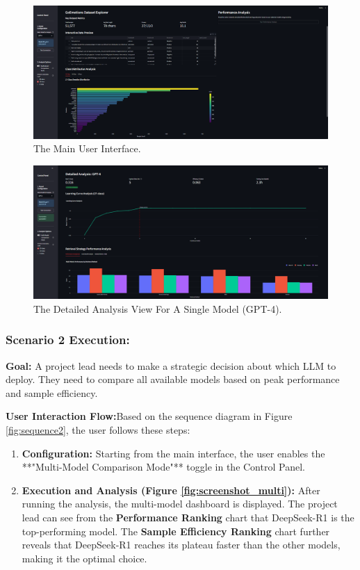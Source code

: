\begin{figure}[H]
    \centering
    \includegraphics[width=\textwidth]{Images/screenshot_main.PNG}
    \caption{The Main User Interface.}
    \label{fig:screenshot_main}
\end{figure}

\begin{figure}[H]
    \centering
    \includegraphics[width=\textwidth]{Images/screenshot_single_model.PNG}
    \caption{The Detailed Analysis View For A Single Model (GPT-4).}
    \label{fig:screenshot_single}
\end{figure}

\subsubsection{Scenario 2 Execution:}

\textbf{Goal:} A project lead needs to make a strategic decision about which LLM to deploy. They need to compare all available models based on peak performance and sample efficiency.

\textbf{User Interaction Flow:}Based on the sequence diagram in Figure \ref{fig:sequence2}, the user follows these steps:
\begin{enumerate}
    \item \textbf{Configuration:} Starting from the main interface, the user enables the **"Multi-Model Comparison Mode"** toggle in the Control Panel.
    
    \item \textbf{Execution and Analysis (Figure \ref{fig:screenshot_multi}):} After running the analysis, the multi-model dashboard is displayed. The project lead can see from the \textbf{Performance Ranking} chart that DeepSeek-R1 is the top-performing model. The \textbf{Sample Efficiency Ranking} chart further reveals that DeepSeek-R1 reaches its plateau faster than the other models, making it the optimal choice.
\end{enumerate}

